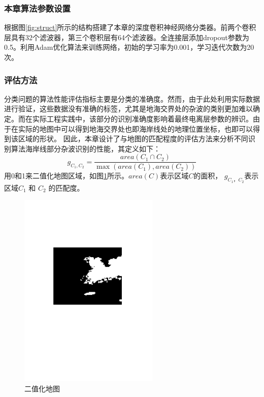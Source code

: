 \subsubsection{本章算法参数设置}
根据图\ref{fig:struct}所示的结构搭建了本章的深度卷积神经网络分类器。前两个卷积层具有32个滤波器，第三个卷积层有64个滤波器。全连接层添加dropout参数为0.5。利用Adam优化算法来训练网络，初始的学习率为0.001，学习迭代次数为20次。
\subsubsection{评估方法}
分类问题的算法性能评估指标主要是分类的准确度。然而，由于此处利用实际数据进行验证，这些数据没有准确的标签，尤其是地海交界处的杂波的类别更加难以确定。而在实际工程实践中，该部分的识别准确度影响着最终电离层参数的辨识。由于在实际的地图中可以得到地海交界处也即海岸线处的地理位置坐标，也即可以得到该区域的形状。
因此，本章设计了与地图的匹配程度的评估方法来分析不同识别算法海岸线部分杂波识别的性能，其定义如下：
\begin{equation}
g_{C_1, C_2} = \frac{area({C_1\cap C_2})}{\max(area({C_1}), area({C_2}))}
\end{equation}
用0和1来二值化地图区域，如图\ref{fig:binary}所示。$area(C)$表示区域$C$的面积， $g_{C_1， C_2}$表示区域$C_1$ 和 $C_2$ 的匹配度。
\begin{figure}[hbt]
	\centering
	\includegraphics[width=6.67cm]{figures/othr/binary}
	\caption{二值化地图}
	\label{fig:binary}
\end{figure}
